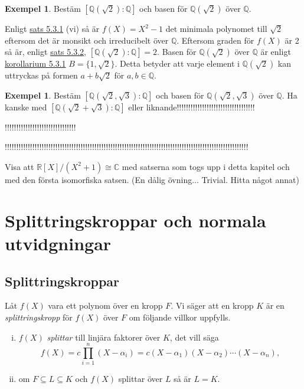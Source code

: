 \documentclass{article}
\theoremstyle{definition}
\newtheorem{exmp}[thm]{Exempel}
\begin{document}
\begin{exmp}
  Bestäm $[\mathbb{Q}(\sqrt{2}): \mathbb{\mathbb{Q}}]$ och basen för $\mathbb{Q}(\sqrt{2})$ över $\mathbb{Q}$.

  Enligt \hyperlink{minpol}{sats 5.3.1} (vi) så är $f(X) = X^2-1$ det minimala polynomet till $\sqrt{2}$ eftersom det är monsikt och irreducibelt över $\mathbb{Q}$. 
  Eftersom graden för $f(X)$ är 2 så är, enligt \hyperlink{5.3.2}{sats 5.3.2}, $[\mathbb{Q}(\sqrt{2}): \mathbb{\mathbb{Q}}] = 2.$ Basen för $\mathbb{Q}(\sqrt{2})$ över $\mathbb{Q}$
  är enligt \hyperlink{kol5.3.1}{korollarium 5.3.1} $B = \{1, \sqrt{2}\}$. Detta betyder att varje element i $\mathbb{Q}(\sqrt{2})$ kan uttryckas 
  på formen $a + b\sqrt{2}$ för $a, b \in \mathbb{Q}.$

\end{exmp}

\begin{exmp}
  Bestäm $[\mathbb{Q}(\sqrt{2}, \sqrt{3}): \mathbb{\mathbb{Q}}]$ och basen för $\mathbb{Q}(\sqrt{2}, \sqrt{3})$ över $\mathbb{Q}$.
  Ha kanske med $[\mathbb{Q}(\sqrt{2} + \sqrt{3}): \mathbb{\mathbb{Q}}]$ eller liknande!!!!!!!!!!!!!!!!!!!!!!!!!!!!!!!!!!
  
  !!!!!!!!!!!!!!!!!!!!!!!!!!!!!!!

  !!!!!!!!!!!!!!!!!!!!!!!!!!!!!!!!!!!!!!!!!!!!!!!!!!!!!!!!!!!!!!!!!!!!!!!!!!!!!!!!!!!!!!!!!!!!!!!!!!!!!!!!!!
\end{exmp}

\begin{ovning}{3}
  Visa att $\mathbb{R}[X]/(X^2+1) \cong \mathbb{C}$ med satserna som togs upp i detta kapitel och med den första isomorfiska satsen. 
  (En dålig övning... Trivial. Hitta något annat) 
\end{ovning}

\section{Splittringskroppar och normala utvidgningar}
\subsection{Splittringskroppar}
\begin{mydef}{}{}
  Låt $f(X)$ vara ett polynom över en kropp $F$. Vi säger att en kropp $K$ är en \textit{splittringskropp} för $f(X)$ över $F$ om följande villkor uppfylls. 
  \begin{enumerate}[(i)]
    \item $f(X)$ \textit{splittar} till linjära faktorer över $K$, det vill säga 
    \[f(X) = c \prod_{i=1}^n (X- \alpha_i) = c(X-\alpha_1)(X-\alpha_2)\cdots (X-\alpha_n),\]
    \item om $F \subseteq L \subseteq K$ och $f(X)$ splittar över $L$ så är $L = K.$
  \end{enumerate}
\end{mydef}
\end{document}
